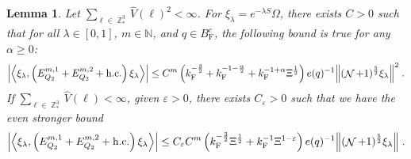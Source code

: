 \documentclass[12pt,a4paper]{article}
\numberwithin{equation}{section}
\newcommand{\NNN}{\mathbb{N}}
\newcommand{\1}{\mathbb{I}}
\newcommand{\F}{\mathrm{F}}
\DeclareMathOperator{\Z}{\mathbb{Z}}
\DeclareMathOperator{\NN}{\mathcal{N}}
\newcommand{\half}{\frac{1}{2}}
\newcommand{\eva}[1]{\left\langle #1 \right\rangle}
\theoremstyle{plain}
\newtheorem{lemma}[theorem]{Lemma}
\theoremstyle{definition}
\theoremstyle{remark}
\theoremstyle{plain}
\theoremstyle{definition}
\theoremstyle{remark}
\begin{document}
\begin{lemma} \label{lem:EQ211}
Let $ \sum_{\ell \in \Z^3_*} \hat{V}(\ell)^2 < \infty $. For $\xi_\lambda = e^{-\lambda S} \Omega$, there exists $ C > 0 $ such that for all $ \lambda \in [0,1] $, $ m \in \NNN $, and $ q \in B_{\F}^c $, the following bound is true for any $ \alpha \ge 0 $:
\begin{align}
	\abs{\eva{\xi_\lambda,\left(E^{m,1}_{Q_2}+E^{m,2}_{Q_2}+\mathrm{h.c.}\right) \xi_\lambda }}
	\leq C^m \left( k_{\F}^{-\frac 32}
		+ k_{\F}^{-1-\frac{\alpha}{2}} 
		+ k_{\F}^{-1+\alpha} \Xi^{\half} \right) e(q)^{-1}
		\norm { (\NN+1)^{\frac 52} \xi_\lambda }^2 \;. \label{eq:estEQ211_Coulomb}
\end{align}
If $ \sum_{\ell \in \Z^3_*} \hat{V}(\ell) < \infty $, given $ \varepsilon > 0 $, there exists $ C_\varepsilon > 0 $ such that we have the even stronger bound
\begin{align}
	\abs{\eva{\xi_\lambda,\left(E^{m,1}_{Q_2}+E^{m,2}_{Q_2}+\mathrm{h.c.}\right) \xi_\lambda }}
	\leq C_\varepsilon C^m \left( k_{\F}^{-\frac{3}{2}} \Xi^\half 
		+ k_{\F}^{-1}\Xi^{1-\varepsilon} \right) e(q)^{-1} 
		\norm { (\NN+1)^{\frac 52} \xi_\lambda } \;. \label{eq:estEQ211}
\end{align}
\end{lemma}

\end{document}
